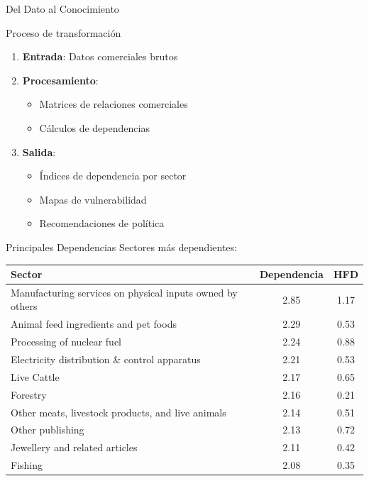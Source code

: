 \documentclass{beamer}
\begin{document}
\begin{frame}{Del Dato al Conocimiento}
    \begin{block}{Proceso de transformación}
        \begin{enumerate}
            \item \textbf{Entrada}: Datos comerciales brutos
            \item \textbf{Procesamiento}: 
                \begin{itemize}
                    \item Matrices de relaciones comerciales
                    \item Cálculos de dependencias
                \end{itemize}
            \item \textbf{Salida}: 
                \begin{itemize}
                    \item Índices de dependencia por sector
                    \item Mapas de vulnerabilidad
                    \item Recomendaciones de política
                \end{itemize}
        \end{enumerate}
    \end{block}
\end{frame}

\begin{frame}{Principales Dependencias}
    \centering
    \scriptsize
    Sectores más dependientes:
    \vspace{0.3cm} %
    \begin{tabular}{|p{6.5cm}|c|c|}
        \hline
        \textbf{Sector} & \textbf{Dependencia} & \textbf{HFD} \\
        \hline
        Manufacturing services on physical inputs owned by others & 2.85 & 1.17 \\
        Animal feed ingredients and pet foods                     & 2.29 & 0.53 \\
        Processing of nuclear fuel                                & 2.24 & 0.88 \\
        Electricity distribution \& control apparatus             & 2.21 & 0.53 \\
        Live Cattle                                               & 2.17 & 0.65 \\
        Forestry                                                  & 2.16 & 0.21 \\
        Other meats, livestock products, and live animals         & 2.14 & 0.51 \\
        Other publishing                                          & 2.13 & 0.72 \\
        Jewellery and related articles                            & 2.11 & 0.42 \\
        Fishing                                                   & 2.08 & 0.35 \\
        \hline
    \end{tabular}
\end{frame}
\end{document}
